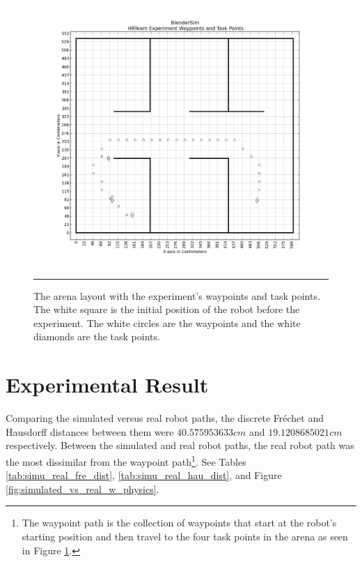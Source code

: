 \begin{figure}[htbp]
\centering
\includegraphics[width=6in]{../Figures/Chapter5/experiment_arena_layout.png}
\rule{35em}{0.5pt}
\caption[HRTeam Experiment Waypoint and Task Points]{The arena layout with the experiment's waypoints and task points. The white square is the initial position of the robot before the experiment. The white circles are the waypoints and the white diamonds are the task points.}
\label{fig:experiment_arena_layout}
\end{figure}

\newpage

\section{Experimental Result}

Comparing the simulated versus real robot paths, the discrete Fr{\'e}chet and Hausdorff distances between them were $40.575953633cm$ and $19.1208685021cm$ respectively. Between the simulated and real robot paths, the real robot path was the most dissimilar from the waypoint path\footnote{The waypoint path is the collection of waypoints that start at the robot's starting position and then travel to the four task points in the arena as seen in Figure \ref{fig:experiment_arena_layout}.}. See Tables \ref{tab:simu_real_fre_dist}, \ref{tab:simu_real_hau_dist}, and Figure \ref{fig:simulated_vs_real_w_physics}.

